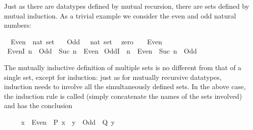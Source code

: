 %
\begin{isabellebody}%
\def\isabellecontext{Mutual}%
%
\isadelimtheory
%
\endisadelimtheory
%
\isatagtheory
%
\endisatagtheory
{\isafoldtheory}%
%
\isadelimtheory
%
\endisadelimtheory
%
\isamarkuptrue%
%
\begin{isamarkuptext}%
Just as there are datatypes defined by mutual recursion, there are sets defined
by mutual induction. As a trivial example we consider the even and odd
natural numbers:%
\end{isamarkuptext}%
\isamarkuptrue%
\isamarkupfalse%
\isanewline
\ \ Even\ {\isacharcolon}{\isacharcolon}\ {\isachardoublequoteopen}nat\ set{\isachardoublequoteclose}\ \isanewline
\ \ Odd\ \ {\isacharcolon}{\isacharcolon}\ {\isachardoublequoteopen}nat\ set{\isachardoublequoteclose}\isanewline
{}\isanewline
\ \ zero{\isacharcolon}\ \ {\isachardoublequoteopen}{}\ {\isasymin}\ Even{\isachardoublequoteclose}\isanewline
{\isacharbar}\ EvenI{\isacharcolon}\ {\isachardoublequoteopen}n\ {\isasymin}\ Odd\ {\isasymLongrightarrow}\ Suc\ n\ {\isasymin}\ Even{\isachardoublequoteclose}\isanewline
{\isacharbar}\ OddI{\isacharcolon}\ \ {\isachardoublequoteopen}n\ {\isasymin}\ Even\ {\isasymLongrightarrow}\ Suc\ n\ {\isasymin}\ Odd{\isachardoublequoteclose}%
\begin{isamarkuptext}%
\noindent
The mutually inductive definition of multiple sets is no different from
that of a single set, except for induction: just as for mutually recursive
datatypes, induction needs to involve all the simultaneously defined sets. In
the above case, the induction rule is called 
(simply concatenate the names of the sets involved) and has the conclusion
\begin{isabelle}%
\ \ \ \ \ {\isacharparenleft}{\isacharquery}x\ {\isasymin}\ Even\ {\isasymlongrightarrow}\ {\isacharquery}P\ {\isacharquery}x{\isacharparenright}\ {\isasymand}\ {\isacharparenleft}{\isacharquery}y\ {\isasymin}\ Odd\ {\isasymlongrightarrow}\ {\isacharquery}Q\ {\isacharquery}y{\isacharparenright}%
\end{isabelle}


\end{isamarkuptext}
\end{isabellebody}

